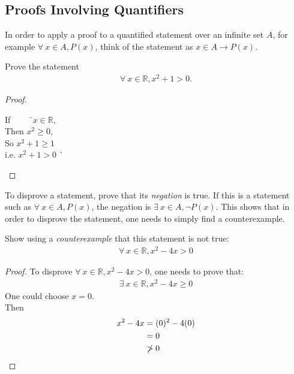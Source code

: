 \documentclass[../notes.tex]{subfiles}
\begin{document}
			\subsection{Proofs Involving Quantifiers}
				In order to apply a proof to a quantified statement over an infinite set $A$, for example $\forall \: x \in A, P(x)$, think of the statement as $x \in A \rightarrow P(x)$.
				\begin{example}
					Prove the statement
					\begin{align*}
						\forall \: x \in \mathbb{R}, x^{2} + 1 > 0.
					\end{align*}
					\begin{proof}
						$ $
						\begin{tabbing}
							If $\qquad$ \=$x \in \mathbb{R}$,\\
							Then \>$x^{2} \geq 0$,\\
							So \> $x^{2} + 1 \geq 1$\\
							i.e. \> $x^{2} + 1 > 0$ \` \qedhere
						\end{tabbing}
					\end{proof}
				\end{example}
				To disprove a statement, prove that its \emph{negation} is true. If this is a statement such as $\forall \: x \in A, P(x)$, the negation is $\exists \: x \in A, \lnot P(x)$. This shows that in order to disprove the statement, one needs to simply find a counterexample.
				\begin{example}
					Show using a \emph{counterexample} that this statement is not true:
					\begin{align*}
						\forall \: x \in \mathbb{R}, x^{2} - 4x > 0
					\end{align*}
					\begin{proof}
						To disprove $\forall \: x \in \mathbb{R}, x^{2} - 4x > 0$, one needs to prove that:
						\begin{align*}
							\exists \: x \in \mathbb{R}, x^{2} - 4x \geq 0
						\end{align*}
						One could choose $x = 0$.\\
						Then \begin{align*}
							x^{2} - 4x &= (0)^{2} - 4(0)\\
							&= 0\\
							& \not > 0 \qedhere
						\end{align*}
					\end{proof}
				\end{example}
			\pagebreak
\end{document}
